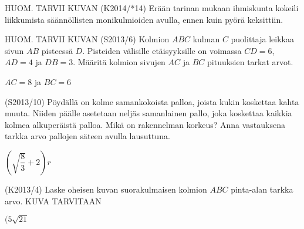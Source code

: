 \begin{tehtava} 
HUOM. TARVII KUVAN 
(K2014/*14) Erään tarinan mukaan ihmiskunta kokeili liikkumista säännöllisten monikulmioiden avulla,
ennen kuin pyörä keksittiin.
				\begin{vastaus}
				\end{vastaus}
\end{tehtava}

 \begin{tehtava} 
HUOM. TARVII KUVAN 
(S2013/6) Kolmion $ABC$ kulman $C$ puolittaja leikkaa sivun $AB$ pisteessä $D$. Pisteiden välisille etäisyyksille on voimassa $CD=6$, $AD=4$ ja $DB=3$. Määritä kolmion sivujen $AC$ ja $BC$ pituuksien tarkat arvot.
  \begin{vastaus}
  $AC=8$ ja $BC=6$
  \end{vastaus}
\end{tehtava}

\begin{tehtava} 
(S2013/10) Pöydällä on kolme samankokoista palloa, joista kukin koskettaa kahta muuta. Niiden päälle asetetaan neljäs samanlainen pallo, joka koskettaa kaikkia kolmea alkuperäistä palloa. Mikä on rakennelman korkeus? Anna vastauksena tarkka arvo pallojen säteen avulla lausuttuna.
  \begin{vastaus}
  $\left(\sqrt{\dfrac83}+2\right)r$
  \end{vastaus}
\end{tehtava}

\begin{tehtava} 
(K2013/4) Laske oheisen kuvan suorakulmaisen kolmion $ABC$ pinta-alan tarkka arvo.
KUVA TARVITAAN
  \begin{vastaus}
  $(5\sqrt{21}$
  \end{vastaus}
\end{tehtava}

